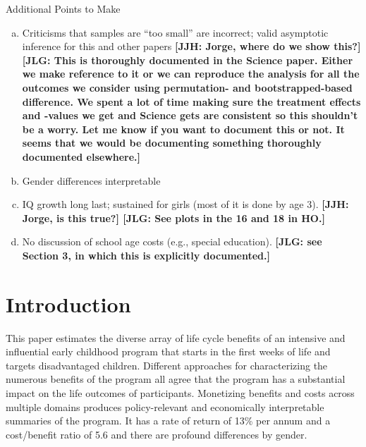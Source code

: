 \noindent Additional Points to Make
\begin{enumerate}[(a)]
\item Criticisms that samples are ``too small'' are incorrect; valid asymptotic inference for this and other papers \textbf{[JJH: Jorge, where do we show this?] [JLG: This is thoroughly documented in the Science paper. Either we make reference to it or we can reproduce the analysis for all the outcomes we consider using permutation- and bootstrapped-based difference. We spent a lot of time making sure the treatment effects and -values we get and Science gets are consistent so this shouldn't be a worry. Let me know if you want to document this or not. It seems that we would be documenting something thoroughly documented elsewhere.]}
\item Gender differences interpretable
\item IQ growth long last; sustained for girls (most of it is done by age 3). \textbf{[JJH: Jorge, is this true?] [JLG: See plots in the 16 and 18 in HO.]}
\item No discussion of school age costs (e.g., special education). \textbf{[JLG: see Section 3, in which this is explicitly documented.]}
\end{enumerate}


\clearpage

\section{Introduction}

This paper estimates the diverse array of life cycle benefits of an intensive and influential early childhood program that starts in the first weeks of life and targets disadvantaged children. Different approaches for characterizing the numerous benefits of the program all agree that the program has a substantial impact on the life outcomes of participants. Monetizing benefits and costs across multiple domains produces policy-relevant and economically interpretable summaries of the program. It has a rate of return of 13\% per annum and a cost/benefit ratio of 5.6 and there are profound differences by gender.

